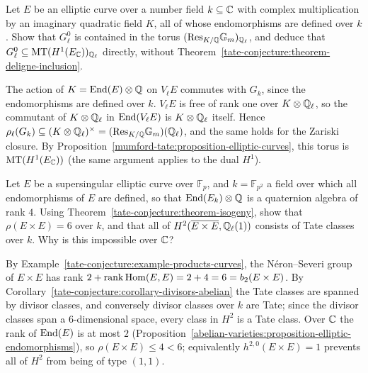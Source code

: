\begin{exercise}\label{tate-conjecture:exercise-elliptic-mt}
Let $E$ be an elliptic curve over a number field $k \subseteq \mathbb{C}$ with complex multiplication by an imaginary quadratic field $K$, all of whose endomorphisms are defined over $k$. Show that $G_\ell^0$ is contained in the
torus $(\mathrm{Res}_{K/\mathbb{Q}}\mathbb{G}_m)_{\mathbb{Q}_\ell}$, and deduce that $G_\ell^0 \subseteq \mathrm{MT}(H^1(E_{\mathbb{C}}))_{\mathbb{Q}_\ell}$ directly, without Theorem~\ref{tate-conjecture:theorem-deligne-inclusion}.
\end{exercise}

\begin{solution}
The action of $K = \operatorname{End}(E) \otimes \mathbb{Q}$ on $V_\ell E$ commutes with $G_k$, since the endomorphisms are defined over $k$. $V_\ell E$ is free of rank one over $K \otimes \mathbb{Q}_\ell$, so the commutant of $K \otimes \mathbb{Q}_\ell$
in $\operatorname{End}(V_\ell E)$ is $K \otimes \mathbb{Q}_\ell$ itself. Hence $\rho_\ell(G_k) \subseteq (K \otimes \mathbb{Q}_\ell)^\times = (\mathrm{Res}_{K/\mathbb{Q}}\mathbb{G}_m)(\mathbb{Q}_\ell)$, and the same holds for the Zariski closure. By
Proposition~\ref{mumford-tate:proposition-elliptic-curves}, this torus is $\mathrm{MT}(H^1(E_{\mathbb{C}}))$ (the same argument applies to the dual $H^1$).
\end{solution}

\begin{exercise}\label{tate-conjecture:exercise-supersingular}
Let $E$ be a supersingular elliptic curve over $\mathbb{F}_p$, and $k = \mathbb{F}_{p^2}$ a field over which all endomorphisms of $E$ are defined, so that $\operatorname{End}(E_k) \otimes \mathbb{Q}$ is a quaternion algebra of rank $4$. Using
Theorem~\ref{tate-conjecture:theorem-isogeny}, show that $\rho(E \times E) = 6$ over $k$, and that all of $H^2(\overline{E \times E}, \mathbb{Q}_\ell(1))$ consists of Tate classes over $k$. Why is this impossible over $\mathbb{C}$?
\end{exercise}

\begin{solution}
By Example~\ref{tate-conjecture:example-products-curves}, the N\'eron--Severi group of $E \times E$ has rank $2 + \operatorname{rank}\operatorname{Hom}(E, E) = 2 + 4 = 6 = b_2(E \times E)$. By Corollary~\ref{tate-conjecture:corollary-divisors-abelian} the
Tate classes are spanned by divisor classes, and conversely divisor classes over $k$ are Tate; since the divisor classes span a $6$-dimensional space, every class in $H^2$ is a Tate class. Over $\mathbb{C}$ the rank of
$\operatorname{End}(E)$ is at most $2$ (Proposition~\ref{abelian-varieties:proposition-elliptic-endomorphisms}), so $\rho(E \times E) \leq 4 < 6$; equivalently $h^{2,0}(E \times E) = 1$ prevents all of $H^2$ from being of type $(1,1)$.
\end{solution}
